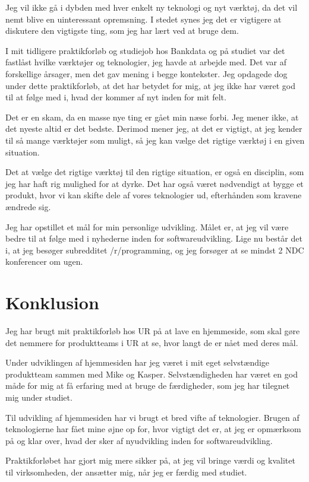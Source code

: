 \documentclass[a4paper]{article}
\begin{document}
Jeg vil ikke gå i dybden med hver enkelt ny teknologi og nyt værktøj,
da det vil nemt blive en uinteressant opremsning.
I stedet synes jeg det er vigtigere at diskutere den vigtigste ting,
som jeg har lært ved at bruge dem.

I mit tidligere praktikforløb og studiejob hos Bankdata
og på studiet var det fastlåst
hvilke værktøjer og teknologier, jeg havde at arbejde med.
Det var af forskellige årsager, men det gav mening i begge kontekster.
Jeg opdagede dog under dette praktikforløb, at det har betydet for mig,
at jeg ikke har været god til at følge med i,
hvad der kommer af nyt inden for mit felt.

Det er en skam, da en masse nye ting er gået min næse forbi.
Jeg mener ikke, at det nyeste altid er det bedste.
Derimod mener jeg, at det er vigtigt,
at jeg kender til så mange værktøjer som muligt,
så jeg kan vælge det rigtige værktøj i en given situation.

Det at vælge det rigtige værktøj til den rigtige situation,
er også en disciplin,
som jeg har haft rig mulighed for at dyrke.
Det har også været nødvendigt at bygge et produkt,
hvor vi kan skifte dele af vores teknologier ud,
efterhånden som kravene ændrede sig.

Jeg har opstillet et mål for min personlige udvikling.
Målet er, at jeg vil være bedre til at følge med i nyhederne inden for softwareudvikling.
Lige nu består det i, at jeg besøger subredditet /r/programming,
og jeg forsøger at se mindst 2 NDC konferencer om ugen.

\newpage
\section{Konklusion}
Jeg har brugt mit praktikforløb hos UR på at lave en hjemmeside,
som skal gøre det nemmere for produktteams i UR at se,
hvor langt de er nået med deres mål.

Under udviklingen af hjemmesiden har jeg været i mit eget selvstændige produktteam sammen med Mike og Kasper.
Selvstændigheden har været en god måde for mig at få erfaring med at bruge de færdigheder,
som jeg har tilegnet mig under studiet.

Til udvikling af hjemmesiden har vi brugt et bred vifte af teknologier.
Brugen af teknologierne har fået mine øjne op for, hvor vigtigt det er,
at jeg er opmærksom på og klar over,
hvad der sker af nyudvikling inden for softwareudvikling.

Praktikforløbet har gjort mig mere sikker på,
at jeg vil bringe værdi og kvalitet til virksomheden,
der ansætter mig,
når jeg er færdig med studiet.
\end{document}
